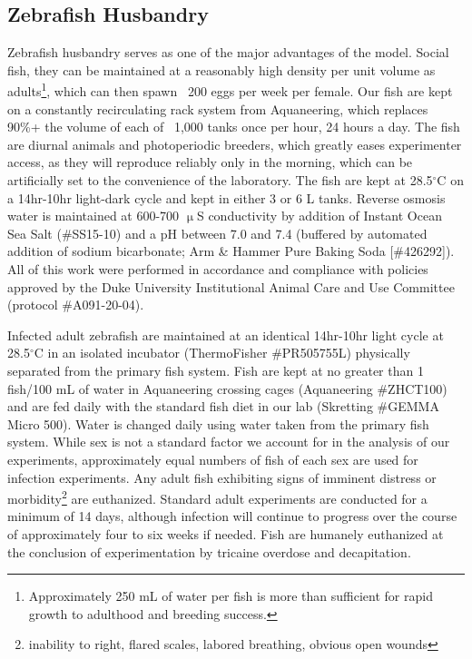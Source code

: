 \subsection{Zebrafish Husbandry}

Zebrafish husbandry serves as one of the major advantages of the model. Social fish, they can be maintained at a reasonably high density per unit volume as adults\footnote{Approximately 250 mL of water per fish is more than sufficient for rapid growth to adulthood and breeding success.}, which can then spawn ~200 eggs per week per female. Our fish are kept on a constantly recirculating rack system from Aquaneering, which replaces 90\%+ the volume of each of ~1,000 tanks once per hour, 24 hours a day. The fish are diurnal animals and photoperiodic breeders, which greatly eases experimenter access, as they will reproduce reliably only in the morning, which can be artificially set to the convenience of the laboratory. The fish are kept at 28.5$^{\circ}$C on a 14hr-10hr light-dark cycle and kept in either 3 or 6 L tanks. Reverse osmosis water is maintained at 600-700 $\upmu$S conductivity by addition of Instant Ocean Sea Salt (\#SS15-10) and a pH between 7.0 and 7.4 (buffered by automated addition of sodium bicarbonate; Arm \& Hammer Pure Baking Soda [\#426292]). All of this work were performed in accordance and compliance with policies approved by the Duke University Institutional Animal Care and Use Committee (protocol \#A091-20-04).

Infected adult zebrafish are maintained at an identical 14hr-10hr light cycle at 28.5$^{\circ}$C in an isolated incubator (ThermoFisher \#PR505755L) physically separated from the primary fish system. Fish are kept at no greater than 1 fish/100 mL of water in Aquaneering crossing cages (Aquaneering \#ZHCT100) and are fed daily with the standard fish diet in our lab (Skretting \#GEMMA Micro 500). Water is changed daily using water taken from the primary fish system. While sex is not a standard factor we account for in the analysis of our experiments, approximately equal numbers of fish of each sex are used for infection experiments. Any adult fish exhibiting signs of imminent distress or morbidity\footnote{inability to right, flared scales, labored breathing, obvious open wounds} are euthanized. Standard adult experiments are conducted for a minimum of 14 days, although infection will continue to progress over the course of approximately four to six weeks if needed. Fish are humanely euthanized at the conclusion of experimentation by tricaine overdose and decapitation.

